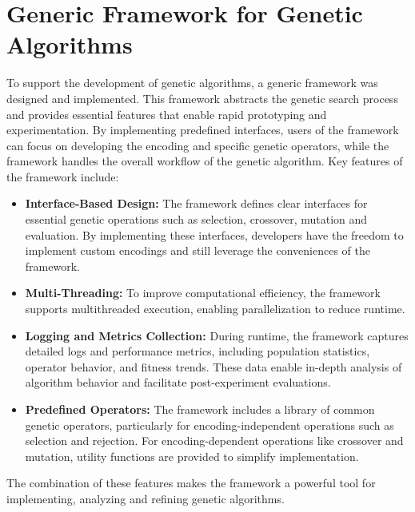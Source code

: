 \documentclass[english,examples]{isasthesis}
\begin{document}
\section{Generic Framework for Genetic Algorithms}
\label{Generic Framework for Genetic Algorithms}
To support the development of genetic algorithms, a generic framework was
designed and implemented. This framework abstracts the genetic search process
and provides essential features that enable rapid prototyping and
experimentation. By implementing predefined interfaces, users of the framework
can focus on developing the encoding and specific genetic operators, while the
framework handles the overall workflow of the genetic algorithm.
Key features of the framework include:
\begin{itemize}
    \item   \textbf{Interface-Based Design:} The framework defines clear
            interfaces for essential genetic operations such as selection,
            crossover, mutation and evaluation. By implementing these
            interfaces, developers have the freedom to implement custom
            encodings and still leverage the conveniences of the framework.

    \item   \textbf{Multi-Threading:} To improve computational efficiency, the
            framework supports multithreaded execution, enabling
            parallelization to reduce runtime.

    \item   \textbf{Logging and Metrics Collection:} During runtime, the
            framework captures detailed logs and performance metrics, including
            population statistics, operator behavior, and fitness trends.
            These data enable in-depth analysis of algorithm behavior and
            facilitate post-experiment evaluations.

    \item   \textbf{Predefined Operators:} The framework includes a library of
            common genetic operators, particularly for encoding-independent
            operations such as selection and rejection. For encoding-dependent
            operations like crossover and mutation, utility functions are
            provided to simplify implementation.
\end{itemize}

The combination of these features makes the framework a powerful tool for
implementing, analyzing and refining genetic algorithms.
\end{document}
